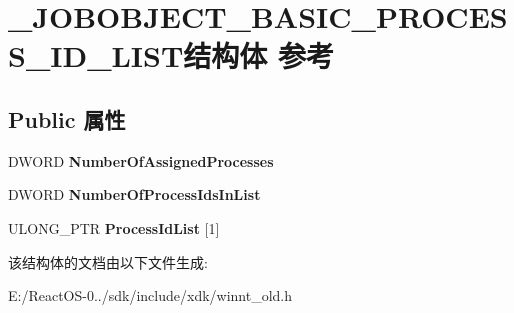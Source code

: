 \hypertarget{struct___j_o_b_o_b_j_e_c_t___b_a_s_i_c___p_r_o_c_e_s_s___i_d___l_i_s_t}{}\section{\+\_\+\+J\+O\+B\+O\+B\+J\+E\+C\+T\+\_\+\+B\+A\+S\+I\+C\+\_\+\+P\+R\+O\+C\+E\+S\+S\+\_\+\+I\+D\+\_\+\+L\+I\+S\+T结构体 参考}
\label{struct___j_o_b_o_b_j_e_c_t___b_a_s_i_c___p_r_o_c_e_s_s___i_d___l_i_s_t}
\subsection*{Public 属性}
\begin{DoxyCompactItemize}
\item 
\mbox{\label{struct___j_o_b_o_b_j_e_c_t___b_a_s_i_c___p_r_o_c_e_s_s___i_d___l_i_s_t_aec0b6c067e791dacdff81ecb1e6396e1}} 
D\+W\+O\+RD {\bfseries Number\+Of\+Assigned\+Processes}
\item 
\mbox{\label{struct___j_o_b_o_b_j_e_c_t___b_a_s_i_c___p_r_o_c_e_s_s___i_d___l_i_s_t_a259b2202507f4c38ac81e757471fd2f2}} 
D\+W\+O\+RD {\bfseries Number\+Of\+Process\+Ids\+In\+List}
\item 
\mbox{\label{struct___j_o_b_o_b_j_e_c_t___b_a_s_i_c___p_r_o_c_e_s_s___i_d___l_i_s_t_a2a5bf6cf02d6a8ff0a3864b7f1d78b1f}} 
U\+L\+O\+N\+G\+\_\+\+P\+TR {\bfseries Process\+Id\+List} \mbox{[}1\mbox{]}
\end{DoxyCompactItemize}


该结构体的文档由以下文件生成\+:\begin{DoxyCompactItemize}
\item 
E\+:/\+React\+O\+S-\/0../sdk/include/xdk/winnt\+\_\+old.\+h\end{DoxyCompactItemize}
